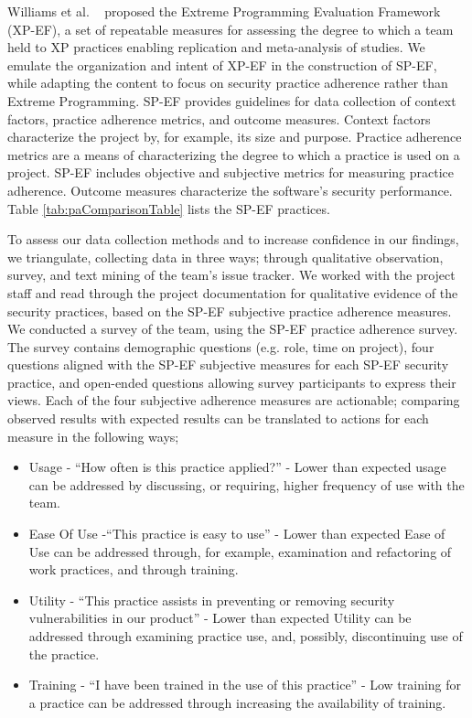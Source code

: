 Williams et al. ~\cite{williams2004toward} proposed the Extreme Programming Evaluation Framework (XP-EF), a set of repeatable measures for assessing the degree to which a team held to XP practices enabling replication and meta-analysis of studies. We emulate the organization and intent of XP-EF in the construction of SP-EF, while adapting the content to focus on security practice adherence rather than Extreme Programming. SP-EF provides guidelines for data collection of context factors, practice adherence metrics, and outcome measures. Context factors characterize the project by, for example, its size and purpose. Practice adherence metrics are a means of characterizing the degree to which a practice is used on a project. SP-EF includes objective and subjective metrics for measuring practice adherence. Outcome measures characterize the software's security performance. Table \ref{tab:paComparisonTable} lists the SP-EF practices.  


To assess our data collection methods and to increase confidence in our findings, we triangulate, collecting data in three ways; through qualitative observation, survey, and text mining of the team's issue tracker. We worked with the project staff and read through the project documentation for qualitative evidence of the security practices, based on the SP-EF subjective practice adherence measures. We conducted a survey of the team, using the SP-EF practice adherence survey. The survey contains demographic questions (e.g. role, time on project), four questions aligned with the SP-EF subjective measures for each SP-EF security practice, and open-ended questions allowing survey participants to express their views. Each of the four subjective adherence measures are actionable; comparing observed results with expected results can be translated to actions for each measure in the following ways;
\begin{itemize}
	\item Usage - ``How often is this practice applied?'' - Lower than expected usage can be addressed by discussing, or requiring, higher frequency of use with the team.
	\item Ease Of Use -``This practice is easy to use'' - Lower than expected Ease of Use can be addressed through, for example, examination and refactoring of work practices, and through training.
	\item Utility - ``This practice assists in preventing or removing security vulnerabilities in our product'' - Lower than expected Utility can be addressed through examining practice use, and, possibly, discontinuing use of the practice.
	\item Training - ``I have been trained in the use of this practice'' - Low training for a practice can be addressed through increasing the availability of training.
\end{itemize}

